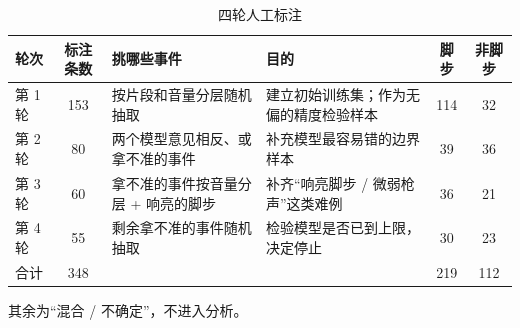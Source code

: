 \begin{table}[htbp]\centering
\caption{四轮人工标注}\label{tab:b_rounds}
{\small\begin{threeparttable}
\begin{tabularx}{\linewidth}{lcLLcc}\toprule
轮次 & 标注条数 & 挑哪些事件 & 目的 & 脚步 & 非脚步 \\
\midrule
第 1 轮 & 153 & 按片段和音量分层随机抽取 & 建立初始训练集；作为无偏的精度检验样本 & 114 & 32 \\
第 2 轮 & 80 & 两个模型意见相反、或拿不准的事件 & 补充模型最容易错的边界样本 & 39 & 36 \\
第 3 轮 & 60 & 拿不准的事件按音量分层 + 响亮的脚步 & 补齐“响亮脚步 / 微弱枪声”这类难例 & 36 & 21 \\
第 4 轮 & 55 & 剩余拿不准的事件随机抽取 & 检验模型是否已到上限，决定停止 & 30 & 23 \\
合计 & 348 &  &  & 219 & 112 \\
\bottomrule\end{tabularx}
\begin{tablenotes}\footnotesize\item 其余为“混合 / 不确定”，不进入分析。\end{tablenotes}\end{threeparttable}}
\end{table}
